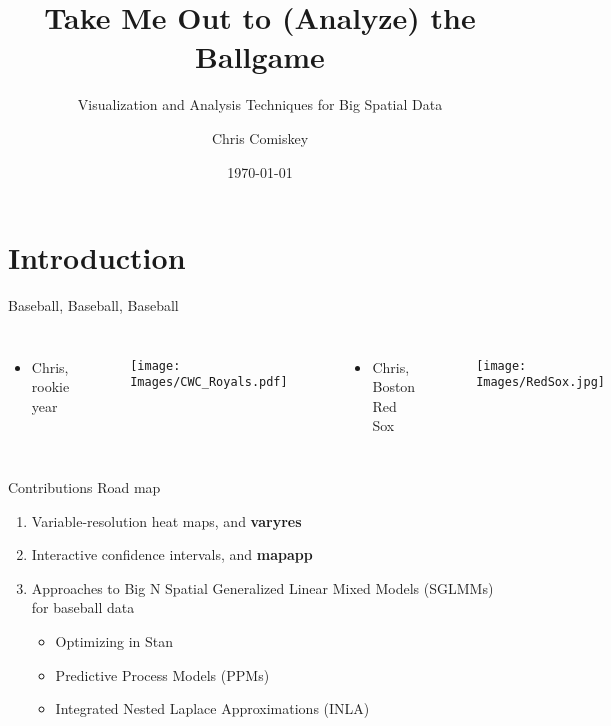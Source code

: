 \documentclass{beamer}
\title{Take Me Out to (Analyze) the Ballgame}
\subtitle{Visualization and Analysis Techniques for Big Spatial Data}
\author{Chris Comiskey}
\institute{Oregon State University}
\date{\today}
\begin{document}
\begin{frame}
  \titlepage
\end{frame}

\section{Introduction}

\begin{frame}{Baseball, Baseball, Baseball} %
\begin{columns}
\begin{itemize}
\item Chris, rookie year
\end{itemize}

        \begin{figure}[H]
      	\centering
      	\texttt{[image: Images/CWC\_Royals.pdf]}
      	\end{figure}

\begin{itemize}
\item Chris, Boston Red Sox
\end{itemize}
  \begin{figure}[H]
	\centering
	\texttt{[image: Images/RedSox.jpg]}
	\end{figure}

\end{columns}
\end{frame}

\begin{frame}{Contributions Road map}{}
\begin{enumerate}
\addtolength{\itemsep}{0.5\baselineskip}
\item Variable-resolution heat maps, and {\bf varyres}
\item Interactive confidence intervals, and {\bf mapapp}
\item Approaches to Big N Spatial Generalized Linear Mixed Models (SGLMMs) for baseball data \\
  \begin{itemize}
  \addtolength{\itemsep}{0.5\baselineskip}
  \item Optimizing in Stan \citep{STANtheMan}
  \item Predictive Process Models (PPMs) \citep{Banerjee2008}
  \item Integrated Nested Laplace Approximations (INLA) \citep{Rue2009}
  \end{itemize}
\end{enumerate}

\end{frame}
\end{document}
